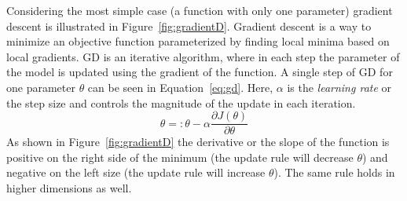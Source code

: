 Considering the most simple case (a function with only one parameter) gradient descent is illustrated in Figure~\ref{fig:gradientD}. Gradient descent is a way to minimize an objective function parameterized by finding local minima based on local gradients.
GD is an iterative algorithm, where in each step the parameter of the model is updated using the gradient of the function. A single step of GD  for one parameter $\theta$ can be seen in Equation~\ref{eq:gd}. Here, $\alpha$ is the \emph{learning rate} or the step size and controls the magnitude of the update in each iteration.
\begin{equation}
\theta=: \theta- \alpha\frac { \partial J(\theta) }{ \partial \theta }
\label{eq:gd}
\end{equation}
As shown in Figure~\ref{fig:gradientD} the derivative or the slope of the function is positive on the right side of the minimum (the update rule will decrease $\theta$) and negative on the left size (the update rule will increase $\theta$). The same rule holds in higher dimensions as well. \\
%

